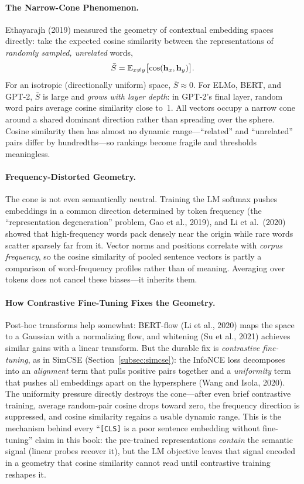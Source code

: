 \paragraph{The Narrow-Cone Phenomenon.}
Ethayarajh (2019) measured the geometry of contextual embedding spaces
directly: take the expected cosine similarity between the representations of
\emph{randomly sampled, unrelated} words,
\[
    \bar{S} = \operatorname{\mathbb{E}}_{x \neq y}\bigl[\cos(\mathbf{h}_x, \mathbf{h}_y)\bigr].
\]
For an isotropic (directionally uniform) space, $\bar{S} \approx 0$.  For
ELMo, BERT, and GPT-2, $\bar{S}$ is large and \emph{grows with layer depth}:
in GPT-2's final layer, random word pairs average cosine similarity close
to~1.  All vectors occupy a narrow cone around a shared dominant direction
rather than spreading over the sphere.  Cosine similarity then has almost no
dynamic range---``related'' and ``unrelated'' pairs differ by hundredths---so
rankings become fragile and thresholds meaningless.

\paragraph{Frequency-Distorted Geometry.}
The cone is not even semantically neutral.  Training the LM softmax pushes
embeddings in a common direction determined by token frequency (the
``representation degeneration'' problem, Gao et al., 2019), and Li et al.\
(2020) showed that high-frequency words pack densely near the origin while
rare words scatter sparsely far from it.  Vector norms and positions
correlate with \emph{corpus frequency}, so the cosine similarity of pooled
sentence vectors is partly a comparison of word-frequency profiles rather
than of meaning.  Averaging over tokens does not cancel these biases---it
inherits them.

\paragraph{How Contrastive Fine-Tuning Fixes the Geometry.}
Post-hoc transforms help somewhat: BERT-flow (Li et al., 2020) maps the
space to a Gaussian with a normalizing flow, and whitening (Su et al., 2021)
achieves similar gains with a linear transform.  But the durable fix is
\emph{contrastive fine-tuning}, as in SimCSE
(Section~\ref{subsec:simcse}): the InfoNCE loss decomposes into an
\emph{alignment} term that pulls positive pairs together and a
\emph{uniformity} term that pushes all embeddings apart on the hypersphere
(Wang and Isola, 2020).  The uniformity pressure directly destroys the
cone---after even brief contrastive training, average random-pair cosine
drops toward zero, the frequency direction is suppressed, and cosine
similarity regains a usable dynamic range.  This is the mechanism behind
every ``\texttt{[CLS]} is a poor sentence embedding without fine-tuning''
claim in this book: the pre-trained representations \emph{contain} the
semantic signal (linear probes recover it), but the LM objective leaves that
signal encoded in a geometry that cosine similarity cannot read until
contrastive training reshapes it.


